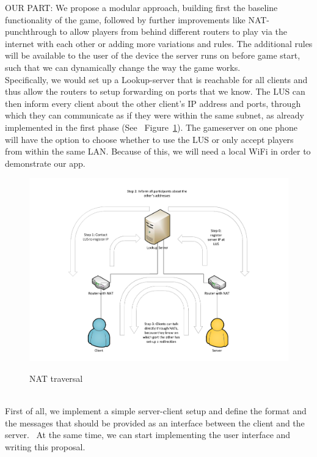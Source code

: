 \documentclass{report}
\newcommand{\lfig}[1]{\label{fig:#1}}
\newcommand{\rfig}[1]{Figure~\ref{fig:#1}}
\begin{document}
OUR PART:
We propose a modular approach, building first the baseline functionality of the game, followed by further improvements like NAT-punchthrough to allow players from behind different routers to play via the internet with each other or adding more variations and rules. The additional rules will be available to the user of the device the server runs on before game start, such that we can dynamically change the way the game works.\\
Specifically, we would set up a Lookup-server that is reachable for all clients and thus allow the routers to setup forwarding on ports that we know. The LUS can then inform every client about the other client's IP address and ports, through which they can communicate as if they were within the same subnet, as already implemented in the first phase (See ~\rfig{nat}). The gameserver on one phone will have the option to choose whether to use the LUS or only accept players from within the same LAN.
Because of this, we will need a local WiFi in order to demonstrate our app.\\
\begin{figure}[h]
	\centering
    \includegraphics[width=\columnwidth]{NATholepunching.pdf}
    \lfig{nat}
    \vspace{-5mm} %
	\caption{NAT traversal}
\end{figure}
\\
First of all, we implement a simple server-client setup and define the format and the messages that should be provided as an interface between the client and the server.~\cite{messaging} At the same time, we can start implementing the user interface and writing this proposal.\\
\end{document}
